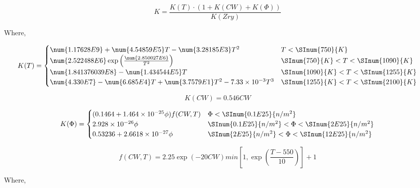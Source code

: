 \begin{equation}
    \label{eq:strength_coefficient_Zirc2_4}
    K= \frac{K(T)\cdot (1+K(CW)+K(\Phi))}{K(Zry)}
\end{equation}

Where,

\begin{equation}
    \label{eq:stength_coefficient_Zirc2_4_K_T}
    K(T) = 
    \begin{cases}
            \num{1.17628E9}+\num{4.54859E5}T-\num{3.28185E3}T^{2}                           & T<\SInum{750}{K}                       \\
            \num{2.522488E6}\exp\left( \frac{\num{2.850027E6}}{T^2} \right)                  & \SInum{750}{K}<T<\SInum{1090}{K}  \\
            \num{1.841376039E8}-\num{1.434544E5}T                                           & \SInum{1090}{K}<T<\SInum{1255}{K} \\
            \num{4.330E7}-\num{6.685E4}T+\num{3.7579E1}T^2 - 7.33 \times 10^{-3}T^3         & \SInum{1255}{K}<T<\SInum{2100}{K}
    \end{cases}
\end{equation}

\begin{equation}
    \label{eq:stength_coefficient_Zirc2_4_K_CW}
    K(CW) = 0.546 CW
\end{equation}

\begin{equation}
    \label{eq:stength_coefficient_Zirc2_4_K_phi}
    K(\Phi) = 
    \begin{cases}
        (0.1464+1.464 \times 10^{-25} \phi)f(CW,T) & \Phi< \SInum{0.1E25}{n/m^2}                         \\
        2.928 \times 10^{-26} \phi                 & \SInum{0.1E25}{n/m^2}< \Phi< \SInum{2E25}{n/m^2} \\
        0.53236+2.6618 \times 10^{-27} \phi        & \SInum{2E25}{n/m^2}< \Phi<\SInum{12E25}{n/m^2}
    \end{cases}
\end{equation}

\begin{equation}
    \label{eq:stength_coefficient_Zirc2_4_f_CW_T}
    f(CW,T)=2.25\exp(-20  CW)  min \left[ 1, \exp \left( \frac{T-550}{10} \right) \right] +1
\end{equation}

Where,

